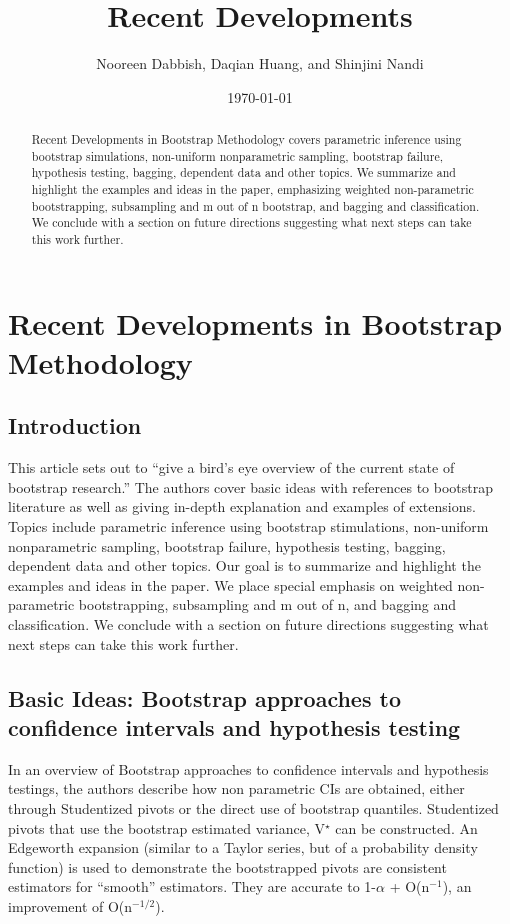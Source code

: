 \documentclass[11pt]{article}
\title{Recent Developments}
\author{Nooreen Dabbish, Daqian Huang, and Shinjini Nandi}
\date{\today}
\begin{document}
\maketitle



\begin{abstract}
Recent Developments in Bootstrap Methodology covers parametric
inference using bootstrap simulations, non-uniform nonparametric
sampling, bootstrap failure, hypothesis testing, bagging, dependent
data and other topics. We summarize and highlight the
examples and ideas in the paper, emphasizing weighted
non-parametric bootstrapping, subsampling and m out of n bootstrap, and bagging
and classification. We conclude with a section on
future directions suggesting what next steps can take this work further.
\end{abstract}

\newpage
\section{Recent Developments in Bootstrap Methodology}
\label{sec-1}
\subsection{Introduction}
\label{sec-1-1}

 
This article sets out to ``give a bird's eye overview of the current
state of bootstrap research.'' The authors cover basic ideas with
references to bootstrap literature as well as giving in-depth
explanation and examples of extensions. Topics include parametric
inference using bootstrap stimulations, non-uniform nonparametric
sampling, bootstrap failure, hypothesis testing, bagging, dependent
data and other topics. Our goal is to summarize and highlight the
examples and ideas in the paper. We place special emphasis on weighted
non-parametric bootstrapping, subsampling and m out of n, and bagging
and classification. We conclude with a section on
future directions suggesting what next steps can take this work further.
\subsection{Basic Ideas: Bootstrap approaches to confidence intervals and hypothesis testing}
\label{sec-1-2}

 
In an overview of Bootstrap approaches  to confidence intervals and
hypothesis testings, the authors describe
how non parametric CIs are obtained, either through Studentized pivots or the direct use of
bootstrap quantiles. Studentized pivots that use the bootstrap
estimated variance, V$^{\star}$ can be constructed. An Edgeworth
expansion (similar to a Taylor series, but of a probability density
function) is used to demonstrate the bootstrapped pivots are
consistent estimators for ``smooth'' estimators. They are accurate to 
1-$\alpha$ + O(n$^{\mathrm{-1}}$), an improvement of O(n$^{\mathrm{-1/2}}$).
\end{document}

